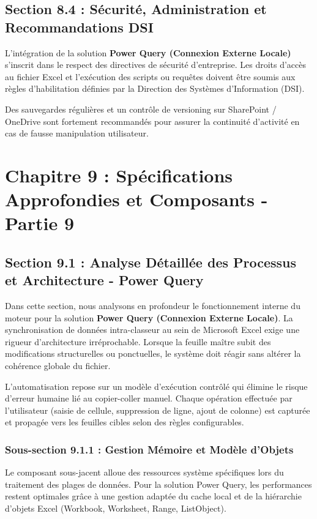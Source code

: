 \documentclass[12pt,a4paper]{report}
\begin{document}
\section{Section 8.4 : Sécurité, Administration et Recommandations DSI}
L'intégration de la solution \textbf{Power Query (Connexion Externe Locale)} s'inscrit dans le respect des directives de sécurité d'entreprise. Les droits d'accès au fichier Excel et l'exécution des scripts ou requêtes doivent être soumis aux règles d'habilitation définies par la Direction des Systèmes d'Information (DSI).

Des sauvegardes régulières et un contrôle de versioning sur SharePoint / OneDrive sont fortement recommandés pour assurer la continuité d'activité en cas de fausse manipulation utilisateur.


\chapter{Chapitre 9 : Spécifications Approfondies et Composants - Partie 9}

\section{Section 9.1 : Analyse Détaillée des Processus et Architecture - Power Query}
Dans cette section, nous analysons en profondeur le fonctionnement interne du moteur pour la solution \textbf{Power Query (Connexion Externe Locale)}. La synchronisation de données intra-classeur au sein de Microsoft Excel exige une rigueur d'architecture irréprochable. Lorsque la feuille maître subit des modifications structurelles ou ponctuelles, le système doit réagir sans altérer la cohérence globale du fichier.

L'automatisation repose sur un modèle d'exécution contrôlé qui élimine le risque d'erreur humaine lié au copier-coller manuel. Chaque opération effectuée par l'utilisateur (saisie de cellule, suppression de ligne, ajout de colonne) est capturée et propagée vers les feuilles cibles selon des règles configurables.


\subsection{Sous-section 9.1.1 : Gestion Mémoire et Modèle d'Objets}
Le composant sous-jacent alloue des ressources système spécifiques lors du traitement des plages de données. Pour la solution Power Query, les performances restent optimales grâce à une gestion adaptée du cache local et de la hiérarchie d'objets Excel (Workbook, Worksheet, Range, ListObject).
\end{document}
